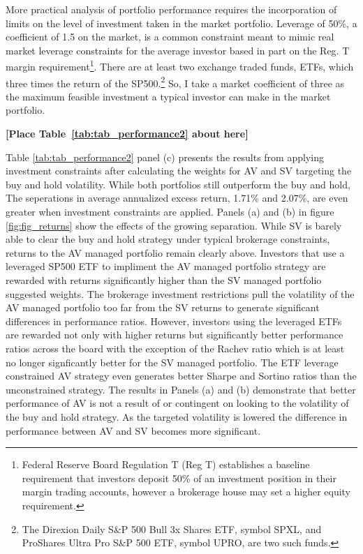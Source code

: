 More practical analysis of portfolio performance requires the incorporation of limits on the level of investment taken in the market portfolio. Leverage of 50\%, a coefficient of 1.5 on the market, is a common constraint meant to mimic real market leverage constraints for the average investor based in part on the Reg. T margin requirement\footnote{Federal Reserve Board Regulation T (Reg T) establishes a baseline requirement that investors deposit 50\% of an investment position in their margin trading accounts, however a brokerage house may set a higher equity requirement.}. \citep{Campbell2008,Rapach2010,Rapach2013,Huang2015,Rapach2016,moreira_volatility-managed_2017,deuskar_margin_2017} There are at least two exchange traded funds, ETFs, which three times the return of the SP500.\footnote{The Direxion Daily S\&P 500 Bull 3x Shares ETF, symbol SPXL, and ProShares Ultra Pro S\&P 500 ETF, symbol UPRO, are two such funds.} So, I take a market coefficient of three as the maximum feasible investment a typical investor can make in the market portfolio. 
\bigskip
\centerline{\bf [Place Table~\ref{tab:tab_performance2} about here]}
\bigskip
Table \ref{tab:tab_performance2} panel (c) presents the results from applying investment constraints after calculating the weights for AV and SV targeting the buy and hold volatility. While both portfolios still outperform the buy and hold, The seperations in average annualized excess return, 1.71\% and 2.07\%, are even greater when investment constraints are applied. Panels (a) and (b) in figure \ref{fig:fig_returns} show the effects of the growing separation. While SV is barely able to clear the buy and hold strategy under typical brokerage constraints, returns to the AV managed portfolio remain clearly above. Investors that use a leveraged SP500 ETF to impliment the AV managed portfolio strategy are rewarded with returns significantly higher than the SV managed portfolio suggested weights. The brokerage investment restrictions pull the volatility of the AV managed portfolio too far from the SV returns to generate significant differences in performance ratios. However, investors using the leveraged ETFs are rewarded not only with higher returns but significantly better performance ratios across the board with the exception of the Rachev ratio which is at least no longer signficantly better for the SV managed portfolio. The ETF leverage constrained AV strategy even generates better Sharpe and Sortino ratios than the unconstrained strategy. The results in Panels (a) and (b) demonstrate that better performance of AV is not a result of or contingent on looking to the volatility of the buy and hold strategy. As the targeted volatility is lowered the difference in performance between AV and SV becomes more significant. %

